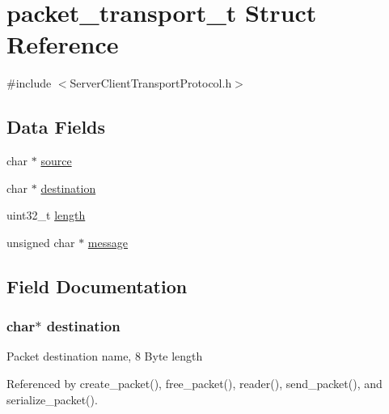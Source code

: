 \hypertarget{structpacket__transport__t}{}\section{packet\+\_\+transport\+\_\+t Struct Reference}
\label{structpacket__transport__t}


{\ttfamily \#include $<$Server\+Client\+Transport\+Protocol.\+h$>$}

\subsection*{Data Fields}
\begin{DoxyCompactItemize}
\item 
char $\ast$ \hyperlink{structpacket__transport__t_aee6937c81d468a0915308234d09d212c}{source}
\item 
char $\ast$ \hyperlink{structpacket__transport__t_ae98a0878a8abb793b89317d904f8c00a}{destination}
\item 
uint32\+\_\+t \hyperlink{structpacket__transport__t_aebb70c2aab3407a9f05334c47131a43b}{length}
\item 
unsigned char $\ast$ \hyperlink{structpacket__transport__t_abb13456032cf48eaa794391b6ed937c7}{message}
\end{DoxyCompactItemize}


\subsection{Field Documentation}
\subsubsection[{\texorpdfstring{destination}{destination}}]{\setlength{\rightskip}{0pt plus 5cm}char$\ast$ destination}\hypertarget{structpacket__transport__t_ae98a0878a8abb793b89317d904f8c00a}{}\label{structpacket__transport__t_ae98a0878a8abb793b89317d904f8c00a}
Packet destination name, 8 Byte length 

Referenced by create\+\_\+packet(), free\+\_\+packet(), reader(), send\+\_\+packet(), and serialize\+\_\+packet().

